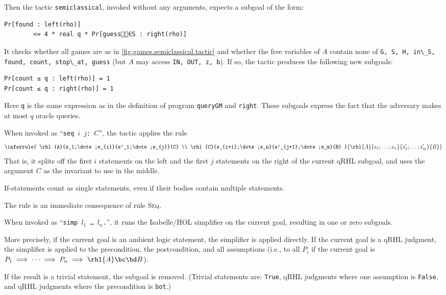 \documentclass{article}
\renewcommand\ruleref[1]{rule \hbox{\textsc{#1}}}
\begin{document}
Then the tactic \texttt{semiclassical}, invoked without any arguments,
expects a subgoal of the form:
{\lstset{language=isabelle}
\begin{lstlisting}
Pr[found : left(rho)]
        <= 4 * real q * Pr[guess∈S : right(rho)]
\end{lstlisting}}
It 
checks whether all games are as
in \autoref{fig:games.semiclassical.tactic} and whether the free
variables of $A$ contain none of \verb|G, S, H, in\_S, found, count, stop\_at, guess| (but $A$ may access \verb|IN, OUT, z, b|).
If so, the tactic produces the following new subgoals:
{\lstset{language=qrhl}%
\begin{lstlisting}
Pr[count ≤ q : left(rho)] = 1
Pr[count ≤ q : right(rho)] = 1
\end{lstlisting}}
%
Here \texttt{q} is the same expression as in the definition of
program \texttt{queryGM} and \texttt{right}.  These subgoals express
the fact that the adversary makes at most $q$ oracle queries.



When invoked as ``\texttt{\frenchspacing seq $i$ $j$: $C$}'', the tactic applies the rule
\[
  \inferrule
  {
    \rhl{A}{s_1;\dots;s_{i}}{s'_1;\dots;s_{j}}{C}
    \\
    \rhl{C}{s_{i+1};\dots;s_n}{s'_{j+1};\dots;s_m}{B}
  }
  {\rhl{A}{s_1;\dots;s_n}{s'_1;\dots;s'_m}{B}}
\]
That is, it splits off the first $i$
statements on the left and the first $j$
statements on the right of the current qRHL subgoal, and uses the
argument $C$ as the invariant to use in the middle.

If-statements count as single statements, even if their bodies contain
multiple statements.

The rule is an immediate consequence of \ruleref{Seq}.


When invoked as ``\texttt{simp $l_1$
  \dots{} $l_n$.}'',
it runs the Isabelle/HOL simplifier on the current goal, resulting in
one or zero subgoals.

More precisely, if the current goal is an ambient logic statement, the
simplifier is applied directly. If the current goal is a qRHL
judgment, the simplifier is applied to the precondition, the
postcondition, and all assumptions (i.e., to all $P_i$
if the current goal is $P_1\implies\dots\implies P_n\implies \rhl{A}\bc\bd B$).

If the result is a trivial statement, the subgoal is removed. (Trivial
statements are: \texttt{True}, qRHL judgments where one assumption is
\texttt{False}, and qRHL judgments where the precondition is
\texttt{bot}.)
\end{document}
